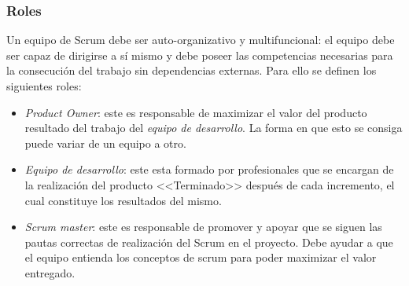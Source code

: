 \subsubsection{Roles}
Un equipo de Scrum debe ser auto-organizativo y multifuncional: el equipo debe ser capaz de dirigirse a sí mismo y debe poseer las competencias necesarias para la consecución del trabajo sin dependencias externas. Para ello se definen los siguientes roles:
\begin{itemize}
    \item \textit{Product Owner}: este es responsable de maximizar el valor del producto resultado del trabajo del \textit{equipo de desarrollo}. La forma en que esto se consiga puede variar de un equipo a otro.
    \item \textit{Equipo de desarrollo}: este esta formado por profesionales que se encargan de la realización del producto <<Terminado>> después de cada incremento, el cual constituye los resultados del mismo.
    \item \textit{Scrum master}: este es responsable de promover y apoyar que se siguen las pautas correctas de realización del Scrum en el proyecto. Debe ayudar a que el equipo entienda los conceptos de scrum para poder maximizar el valor entregado.
\end{itemize}
